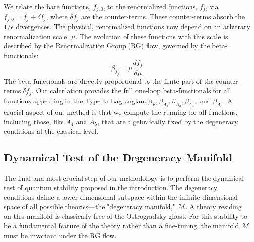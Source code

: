 \documentclass[twocolumn]{aastex631}
\begin{document}
We relate the bare functions, $f_{j,0}$, to the renormalized functions, $f_j$, via $f_{j,0} = f_j + \delta f_j$, where $\delta f_j$ are the counter-terms. These counter-terms absorb the $1/\epsilon$ divergences. The physical, renormalized functions now depend on an arbitrary renormalization scale, $\mu$. The evolution of these functions with this scale is described by the Renormalization Group (RG) flow, governed by the beta-functionals:
\begin{equation}
    \beta_{f_j} = \mu \frac{d f_j}{d\mu}
\end{equation}
The beta-functionals are directly proportional to the finite part of the counter-terms $\delta f_j$. Our calculation provides the full one-loop beta-functionals for all functions appearing in the Type Ia Lagrangian: $\beta_F, \beta_{A_1}, \beta_{A_3}, \beta_{A_4},$ and $\beta_{A_5}$. A crucial aspect of our method is that we compute the running for all functions, including those, like $A_4$ and $A_5$, that are algebraically fixed by the degeneracy conditions at the classical level.

\subsection{Dynamical Test of the Degeneracy Manifold}

The final and most crucial step of our methodology is to perform the dynamical test of quantum stability proposed in the introduction. The degeneracy conditions define a lower-dimensional subspace within the infinite-dimensional space of all possible theories---the "degeneracy manifold," $\mathcal{M}$. A theory residing on this manifold is classically free of the Ostrogradsky ghost. For this stability to be a fundamental feature of the theory rather than a fine-tuning, the manifold $\mathcal{M}$ must be invariant under the RG flow.
\end{document}
